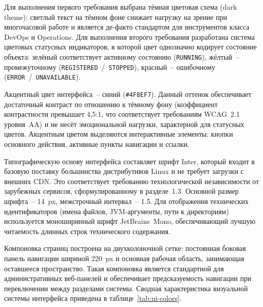 Для выполнения первого требования выбрана тёмная цветовая схема (dark theme): светлый текст на тёмном фоне снижает нагрузку на зрение при многочасовой работе и является де-факто стандартом для инструментов класса DevOps и Operations. Для выполнения второго требования разработана система цветовых статусных индикаторов, в которой цвет однозначно кодирует состояние объекта: зелёный соответствует активному состоянию (\texttt{RUNNING}), жёлтый~-- промежуточному (\texttt{REGISTERED}~/~\texttt{STOPPED}), красный~-- ошибочному (\texttt{ERROR}~/~\texttt{UNAVAILABLE}).

Акцентный цвет интерфейса~-- синий (\texttt{\#4F8EF7}). Данный оттенок обеспечивает достаточный контраст по отношению к тёмному фону (коэффициент контрастности превышает 4,5:1, что соответствует требованиям WCAG~2.1 уровня~AA) и не несёт эмоциональной нагрузки, характерной для статусных цветов. Акцентным цветом выделяются интерактивные элементы: кнопки основного действия, активные пункты навигации и ссылки.

Типографическую основу интерфейса составляет шрифт Inter, который входит в базовую поставку большинства дистрибутивов Linux и не требует загрузки с внешних CDN. Это соответствует требованию технологической независимости от зарубежных сервисов, сформулированному в разделе~1.3. Основной размер шрифта~-- 14~px, межстрочный интервал~-- 1.5. Для отображения технических идентификаторов (имена файлов, JVM-аргументы, пути к директориям) используется моноширинный шрифт JetBrains~Mono, обеспечивающий лучшую читаемость длинных строк технического содержания.

Компоновка страниц построена на двухколоночной сетке: постоянная боковая панель навигации шириной 220~px и основная рабочая область, занимающая оставшееся пространство. Такая компоновка является стандартной для административных веб-панелей и обеспечивает предсказуемость навигации при переключении между разделами системы. Сводная характеристика визуальной системы интерфейса приведена в таблице~\ref{tab:ui-colors}.

